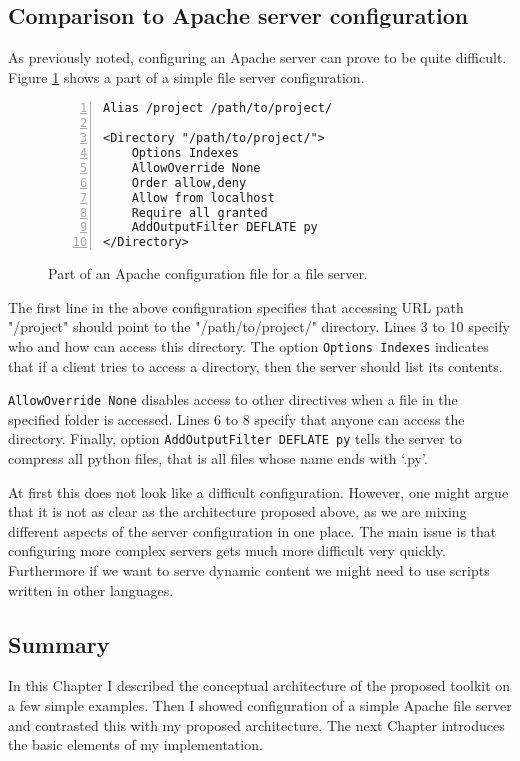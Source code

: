 \subsection{Comparison to Apache server configuration}
As previously noted, configuring an Apache server can prove to be quite difficult.
Figure \ref{fig:apache} shows a part of a simple file server
configuration.
\begin{figure}[h]
\centering
\begin{lstlisting}[numbers=left]
Alias /project /path/to/project/

<Directory "/path/to/project/">
    Options Indexes
    AllowOverride None
    Order allow,deny
    Allow from localhost
    Require all granted
    AddOutputFilter DEFLATE py
</Directory>
\end{lstlisting}
\caption[scale=1.0]{Part of an Apache configuration file for a file server.}
\label{fig:apache}
\end{figure}

The first line in the above configuration specifies that accessing URL 
path "/project" should point to the "/path/to/project/" directory.
Lines 3 to 10 specify who and how can access this directory.
The option \texttt{Options Indexes} indicates that if a client tries
to access a directory, then the server should list its contents.

\texttt{AllowOverride None} disables access to other directives when 
a file in the specified folder is accessed. Lines 6 to 8 specify that
anyone can access the directory. Finally, option 
\texttt{AddOutputFilter DEFLATE py} tells the server to compress
all python files, that is all files whose name ends with `.py'.

At first this does not look like a difficult configuration. However, 
one might argue that it is not as clear as the architecture proposed above,
as we are mixing different aspects of the server configuration in one place.
The main issue is that configuring more complex servers gets much more 
difficult very quickly. Furthermore if we want to serve dynamic content
we might need to use scripts written in other languages.

\subsection{Summary}
In this Chapter I described the conceptual architecture of the proposed
toolkit on a few simple examples. Then I showed configuration of a simple
Apache file server and contrasted this with my proposed architecture.
The next Chapter introduces the basic elements of my implementation.
